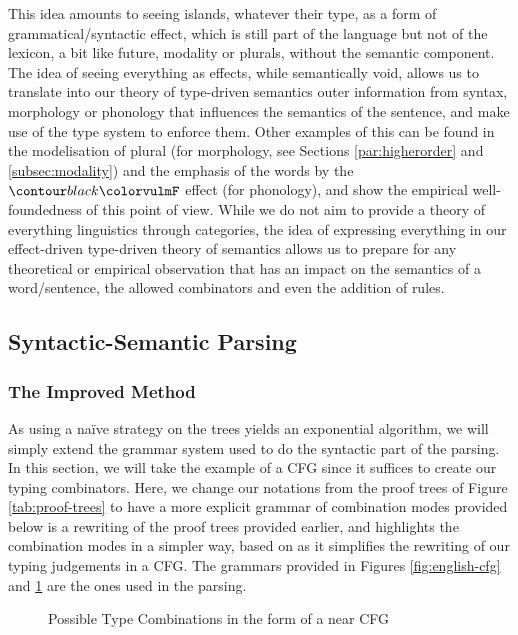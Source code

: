\medskip

This idea amounts to seeing islands, whatever their type, as a form of
grammatical/syntactic effect, which is still part of the language but not of
the lexicon, a bit like future, modality or plurals, without the semantic
component.
The idea of seeing everything as effects, while semantically void, allows us
to translate into our theory of type-driven semantics outer information from
syntax, morphology or phonology that influences the semantics of the
sentence, and make use of the type system to enforce them.
Other examples of this can be found in the modelisation of plural (for
morphology, see Sections \ref{par:higherorder} and \ref{subsec:modality})
and the emphasis of the words by the $\f{F}$ effect (for phonology), and show
the empirical well-foundedness of this point of view.
While we do not aim to provide a theory of everything linguistics through
categories, the idea of expressing everything in our effect-driven type-driven
theory of semantics allows us to prepare for any theoretical or empirical
observation that has an impact on the semantics of a word/sentence, the allowed
combinators and even the addition of rules.

\subsection{Syntactic-Semantic Parsing}
\label{subsec:ssparsing}
\subsubsection{The Improved Method}
As using a naïve strategy on the trees yields an exponential algorithm,
we will simply extend the grammar system used to do the syntactic part of the
parsing.
In this section, we will take the example of a CFG since it suffices to create
our typing combinators.
Here, we change our notations from the proof trees of Figure
\ref{tab:proof-trees} to have a more explicit grammar of combination modes
provided below is a rewriting of the proof trees provided earlier, and
highlights the combination modes in a simpler way, based on
\cite{bumfordEffectdrivenInterpretationFunctors2025} as it simplifies the
rewriting of our typing judgements in a CFG.
The grammars provided in Figures \ref{fig:english-cfg} and
\ref{fig:combination-cfg} are the ones used in the parsing.

\begin{figure}
	\centering
	\caption{Possible Type Combinations in the form of a near CFG}
	\label{fig:combination-cfg}
\end{figure}

